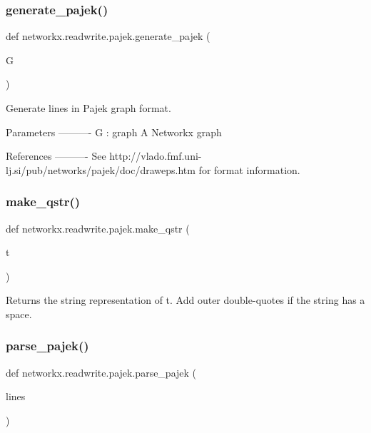 \subsubsection{\texorpdfstring{generate\+\_\+pajek()}{generate\_pajek()}}
{\footnotesize\ttfamily def networkx.\+readwrite.\+pajek.\+generate\+\_\+pajek (\begin{DoxyParamCaption}\item[{}]{G }\end{DoxyParamCaption})}

\begin{DoxyVerb}Generate lines in Pajek graph format.

Parameters
----------
G : graph
   A Networkx graph

References
----------
See http://vlado.fmf.uni-lj.si/pub/networks/pajek/doc/draweps.htm
for format information.
\end{DoxyVerb}
 \mbox{\label{namespacenetworkx_1_1readwrite_1_1pajek_adda16690a7a608d9cb3404328762c8d6}} 
\subsubsection{\texorpdfstring{make\+\_\+qstr()}{make\_qstr()}}
{\footnotesize\ttfamily def networkx.\+readwrite.\+pajek.\+make\+\_\+qstr (\begin{DoxyParamCaption}\item[{}]{t }\end{DoxyParamCaption})}

\begin{DoxyVerb}Returns the string representation of t.
Add outer double-quotes if the string has a space.
\end{DoxyVerb}
 \mbox{\label{namespacenetworkx_1_1readwrite_1_1pajek_a209aa5831d8b00d51d17f6350018b4bb}} 
\subsubsection{\texorpdfstring{parse\+\_\+pajek()}{parse\_pajek()}}
{\footnotesize\ttfamily def networkx.\+readwrite.\+pajek.\+parse\+\_\+pajek (\begin{DoxyParamCaption}\item[{}]{lines }\end{DoxyParamCaption})}

